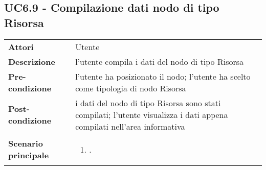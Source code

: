 \subsection{UC6.9 - Compilazione dati nodo di tipo Risorsa} 
\label{sssec:UC6.9} 
\def\arraystretch{1.5}
\begin{tabularx}{\textwidth}{l|p{}}
	\rowcolor{I} \multicolumn{2}{c}{\color{white}\textbf{UC6.9 - Compilazione dati nodo di tipo Risorsa}} \\
	\toprule
	\endhead
	\textbf{Attori} & Utente\\
	\textbf{Descrizione} & l'utente compila i dati del nodo di tipo Risorsa\\
	\textbf{Pre-condizione} & l'utente ha posizionato il nodo; l'utente ha scelto come tipologia di nodo Risorsa\\
	\textbf{Post-condizione} & i dati del nodo di tipo Risorsa sono stati compilati; l'utente visualizza i dati appena compilati nell'area informativa\\
	\textbf{Scenario principale} & \vspace{-1.2em}\begin{enumerate}[leftmargin=*,noitemsep,nosep]
		\item \nameref{sssec:UC6.9}.
	\end{enumerate}\\
	\bottomrule
\end{tabularx}
